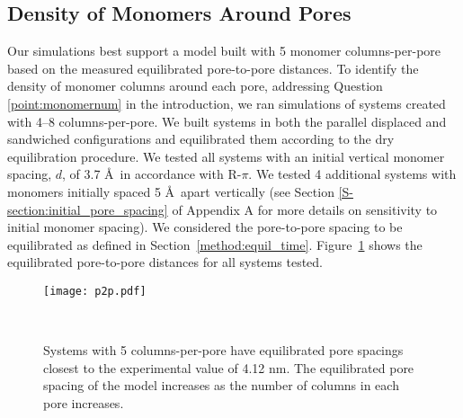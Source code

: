   \subsection{Density of Monomers Around Pores}\label{section:mon_per_pore}
  
  Our simulations best support a model built with 5 monomer columns-per-pore
  based on the measured equilibrated pore-to-pore distances. To identify the
  density of monomer columns around each pore, addressing Question
  \ref{point:monomernum} in the introduction, we ran simulations of systems
  created with 4--8 columns-per-pore. We built systems in both the parallel
  displaced and sandwiched configurations and equilibrated them according to the
  dry equilibration procedure. We tested all systems with an initial vertical
  monomer spacing, $\mathit{d}$, of 3.7 \AA~in accordance with R-$\pi$. We tested
  4 additional systems with monomers initially spaced 5 \AA~apart vertically (see
  Section \ref{S-section:initial_pore_spacing} of Appendix A for more details on
  sensitivity to initial monomer spacing). We considered the pore-to-pore
  spacing to be equilibrated as defined in Section~\ref{method:equil_time}.
  Figure~\ref{fig:p2p} shows the equilibrated pore-to-pore distances for all
  systems tested. 
  
  \begin{figure}[!htb]
	\centering
	\texttt{[image: p2p.pdf]}
	\caption{Systems with 5 columns-per-pore have equilibrated pore spacings closest to
			 the experimental value of 4.12 nm. The equilibrated pore spacing of the model 	
			 increases as the number of columns in each pore increases.}~\label{fig:p2p}
  \end{figure}  
  
